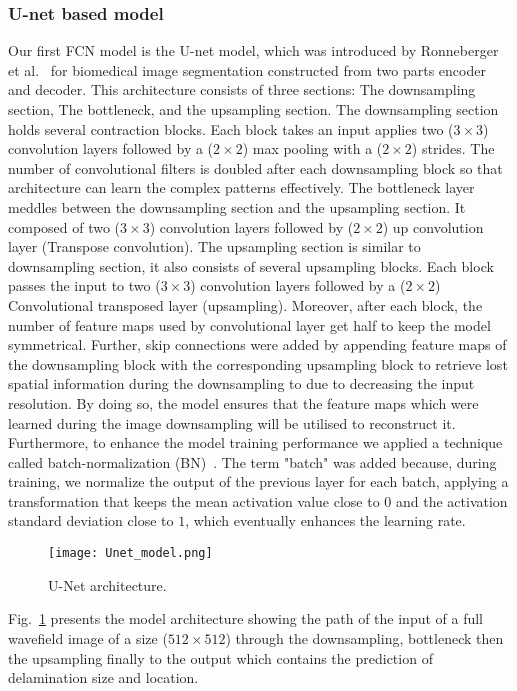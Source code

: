 \documentclass[preprint,9pt]{elsarticle}
\begin{document}
\subsubsection{U-net based model}
Our first FCN model is the U-net model, which was introduced by Ronneberger et al.~\cite{Ronneberger2015} for biomedical image segmentation constructed from two parts encoder and decoder. 
This architecture consists of three sections: The downsampling section, The bottleneck, and the upsampling section. 
The downsampling section holds several contraction blocks. 
Each block takes an input applies two (\(3\times3\)) convolution layers followed by a (\(2\times2\)) max pooling with a (\(2\times2\)) strides. 
The number of convolutional filters is doubled after each downsampling block so that architecture can learn the complex patterns effectively. 
The bottleneck layer meddles between the downsampling section and the upsampling section. 
It composed of two (\(3\times3\)) convolution layers followed by (\(2\times2\)) up convolution layer (Transpose convolution).
The upsampling section is similar to downsampling section, it also consists of several upsampling blocks. 
Each block passes the input to two (\(3\times3\)) convolution layers followed by a (\(2\times2\)) Convolutional transposed layer (upsampling). 
Moreover, after each block, the number of feature maps used by convolutional layer get half to keep the model symmetrical. 
Further, skip connections were added by appending feature maps of the downsampling block with the corresponding upsampling block to retrieve lost spatial information during the downsampling to due to decreasing the input resolution.
By doing so, the model ensures that the feature maps which were learned during the image downsampling will be utilised to reconstruct it. 
Furthermore, to enhance the model training performance we applied a technique called batch-normalization (BN)~\cite{Ioffe2015}.
The term "batch" was added because, during training, we normalize the output of the previous layer for each batch, applying a transformation that keeps the mean activation value close to \(0\) and the activation standard deviation close to \(1\), which eventually enhances the learning rate.
\begin{figure} [h!]
	\begin{center}
		\texttt{[image: Unet\_model.png]}
	\end{center}
	\caption{U-Net architecture.} 
	\label{fig:Unet}
\end{figure}
Fig.~\ref{fig:Unet} presents the model architecture showing the path of the input of a full wavefield image of a size (\(512\times512\)) through the downsampling, bottleneck then the upsampling finally to the output which contains the prediction of delamination size and location. 
\end{document}
